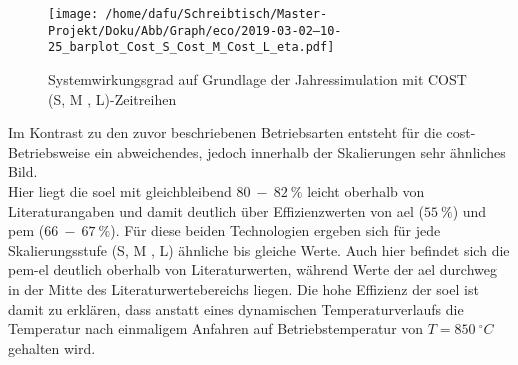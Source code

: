 \documentclass[onecolumn,10pt,titlepage]{article}
\begin{document}
\begin{figure}[H]
	
	\centering
	\texttt{[image: /home/dafu/Schreibtisch/Master-Projekt/Doku/Abb/Graph/eco/2019-03-02--10-25\_barplot\_Cost\_S\_Cost\_M\_Cost\_L\_eta.pdf]}
	\caption[Systemwirkungsgrad-COST]{Systemwirkungsgrad auf Grundlage der Jahressimulation mit COST (S, M , L)-Zeitreihen  }
	\label{fig:analy_COST_eta} 
\end{figure}
Im Kontrast zu den zuvor beschriebenen Betriebsarten entsteht für die \gls{cost}-Betriebsweise ein abweichendes, jedoch innerhalb der Skalierungen sehr ähnliches Bild.\\
Hier liegt die  \gls{soel} mit gleichbleibend $80~-~82~ \%$ leicht oberhalb von Literaturangaben und damit deutlich über Effizienzwerten von \gls{ael} ($55~\%$) und \gls{pem} ($66~-~67~\%$). Für diese beiden Technologien ergeben sich für jede Skalierungsstufe (S, M , L) ähnliche bis gleiche Werte. Auch hier befindet sich die \gls{pem}-\gls{el} deutlich oberhalb von Literaturwerten, während Werte der \gls{ael} durchweg in der Mitte des Literaturwertebereichs liegen.
Die hohe Effizienz der \gls{soel} ist damit zu erklären, dass anstatt eines dynamischen Temperaturverlaufs die Temperatur nach einmaligem Anfahren auf Betriebstemperatur von $T=850~^\circ C$ gehalten wird. 
\end{document}
